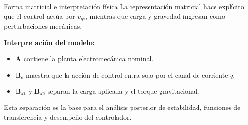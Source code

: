 \documentclass[aspectratio=169,t]{beamer}
\begin{document}
\begin{frame}{Forma matricial e interpretación física}
{\small\color{uncGray}La representación matricial hace explícito que el control actúa por $v_{qs}$, mientras que carga y gravedad ingresan como perturbaciones mecánicas.}\par
\vspace{2mm}

\centering
{}

\textbf{Interpretación del modelo:}
\begin{itemize}
  \item $\bm{A}$ contiene la planta electromecánica nominal.
  \item $\bm{B}_c$ muestra que la acción de control entra solo por el canal de corriente $q$.
  \item $\bm{B}_{d1}$ y $\bm{B}_{d2}$ separan la carga aplicada y el torque gravitacional.
\end{itemize}

{\small Esta separación es la base para el análisis posterior de estabilidad, funciones de transferencia y desempeño del controlador.}
\end{frame}
\end{document}
